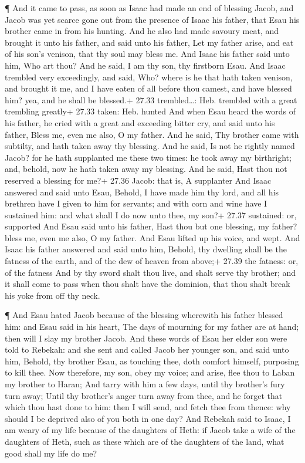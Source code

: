  ¶ And it came to pass, as soon as Isaac had made an end of
blessing Jacob, and Jacob was yet scarce gone out from the presence of
Isaac his father, that Esau his brother came in from his hunting.
 And he also had made savoury meat, and brought it unto his
father, and said unto his father, Let my father arise, and eat of his
son's venison, that thy soul may bless me.  And Isaac his
father said unto him, Who art thou? And he said, I am thy son, thy
firstborn Esau.  And Isaac trembled very exceedingly, and
said, Who? where is he that hath taken venison, and brought it me, and I
have eaten of all before thou camest, and have blessed him? yea, and he
shall be blessed.+ 27.33 trembled\ldots: Heb. trembled with a great
trembling greatly+ 27.33 taken: Heb. hunted  And when Esau
heard the words of his father, he cried with a great and exceeding
bitter cry, and said unto his father, Bless me, even me also, O my
father.  And he said, Thy brother came with subtilty, and
hath taken away thy blessing.  And he said, Is not he
rightly named Jacob? for he hath supplanted me these two times: he took
away my birthright; and, behold, now he hath taken away my blessing. And
he said, Hast thou not reserved a blessing for me?+ 27.36 Jacob: that
is, A supplanter  And Isaac answered and said unto Esau,
Behold, I have made him thy lord, and all his brethren have I given to
him for servants; and with corn and wine have I sustained him: and what
shall I do now unto thee, my son?+ 27.37 sustained: or, supported
 And Esau said unto his father, Hast thou but one blessing,
my father? bless me, even me also, O my father. And Esau lifted up his
voice, and wept.  And Isaac his father answered and said
unto him, Behold, thy dwelling shall be the fatness of the earth, and of
the dew of heaven from above;+ 27.39 the fatness: or, of the fatness
 And by thy sword shalt thou live, and shalt serve thy
brother; and it shall come to pass when thou shalt have the dominion,
that thou shalt break his yoke from off thy neck.

 ¶ And Esau hated Jacob because of the blessing wherewith
his father blessed him: and Esau said in his heart, The days of mourning
for my father are at hand; then will I slay my brother Jacob.
 And these words of Esau her elder son were told to
Rebekah: and she sent and called Jacob her younger son, and said unto
him, Behold, thy brother Esau, as touching thee, doth comfort himself,
purposing to kill thee.  Now therefore, my son, obey my
voice; and arise, flee thou to Laban my brother to Haran; 
And tarry with him a few days, until thy brother's fury turn away;
 Until thy brother's anger turn away from thee, and he
forget that which thou hast done to him: then I will send, and fetch
thee from thence: why should I be deprived also of you both in one day?
 And Rebekah said to Isaac, I am weary of my life because
of the daughters of Heth: if Jacob take a wife of the daughters of Heth,
such as these which are of the daughters of the land, what good shall my
life do me?

